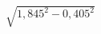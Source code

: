 \begin{ex}[type=calculate]
	\begin{condition}
		\( \sqrt{1,845^2-0,405^2} \)
	\end{condition}
\end{ex}